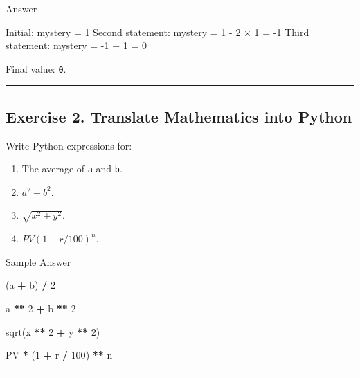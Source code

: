 \documentclass[
]{article}
\newenvironment{Shaded}{\begin{snugshade}}{\end{snugshade}}
\newcommand{\DecValTok}[1]{\textcolor[rgb]{0.00,0.00,0.81}{#1}}
\newcommand{\NormalTok}[1]{#1}
\newcommand{\OperatorTok}[1]{\textcolor[rgb]{0.81,0.36,0.00}{\textbf{#1}}}
\providecommand{\tightlist}{%
  \setlength{\itemsep}{0pt}\setlength{\parskip}{0pt}}
\begin{document}
Answer

\begin{Shaded}
\begin{Highlighting}[]
\NormalTok{Initial: mystery = 1}
\NormalTok{Second statement: mystery = 1 {-} 2 × 1 = {-}1}
\NormalTok{Third statement: mystery = {-}1 + 1 = 0}
\end{Highlighting}
\end{Shaded}

Final value: \texttt{0}.

\begin{center}\rule{0.5\linewidth}{0.5pt}\end{center}

\subsection{Exercise 2. Translate Mathematics into
Python}\label{exercise-2.-translate-mathematics-into-python}

Write Python expressions for:

\begin{enumerate}
\def\labelenumi{\arabic{enumi}.}
\tightlist
\item
  The average of \texttt{a} and \texttt{b}.
\item
  \(a^2+b^2\).
\item
  \(\sqrt{x^2+y^2}\).
\item
  \(PV(1+r/100)^n\).
\end{enumerate}

Sample Answer

\begin{Shaded}
\begin{Highlighting}[]
\NormalTok{(a }\OperatorTok{+}\NormalTok{ b) }\OperatorTok{/} \DecValTok{2}

\NormalTok{a }\OperatorTok{**} \DecValTok{2} \OperatorTok{+}\NormalTok{ b }\OperatorTok{**} \DecValTok{2}

\NormalTok{sqrt(x }\OperatorTok{**} \DecValTok{2} \OperatorTok{+}\NormalTok{ y }\OperatorTok{**} \DecValTok{2}\NormalTok{)}

\NormalTok{PV }\OperatorTok{*}\NormalTok{ (}\DecValTok{1} \OperatorTok{+}\NormalTok{ r }\OperatorTok{/} \DecValTok{100}\NormalTok{) }\OperatorTok{**}\NormalTok{ n}
\end{Highlighting}
\end{Shaded}

\begin{center}\rule{0.5\linewidth}{0.5pt}\end{center}
\end{document}
